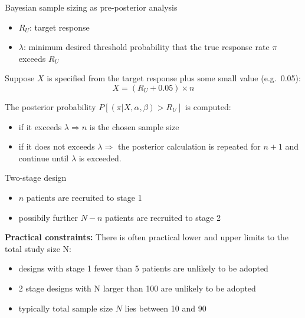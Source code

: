 \documentclass{beamer}
\begin{document}
\begin{frame}{Bayesian sample sizing as pre-posterior analysis}

\begin{itemize}
\itemsep1pt\parskip0pt
\item
  \(R_U\): target response
\item
  \(\lambda\): minimum desired threshold probability that the true
  response rate \(\pi\) exceeds \(R_U\)
\end{itemize}

Suppose \(X\) is specified from the target response plus some small
value (e.g.~0.05): \[X=(R_U+0.05)\times n\]

The posterior probability \(P[(\pi\vert X,\alpha, \beta)>R_U]\) is computed:

\begin{itemize}
\itemsep1pt\parskip0pt
\item
  if it exceeds \(\lambda \Longrightarrow n\) is the chosen sample size
\item
  if it does not exceeds \(\lambda \Longrightarrow\) the posterior
  calculation is repeated for \(n+1\) and continue until \(\lambda\) is
  exceeded.
\end{itemize}

\end{frame}

\begin{frame}{Two-stage design}

\begin{itemize}
\itemsep1pt\parskip0pt
\item
  \(n\) patients are recruited to stage 1
\item
  possibily further \(N-n\) patients are recruited to stage 2
\end{itemize}

\textbf{Practical constraints:} There is often practical lower and upper
limits to the total study size N:

\begin{itemize}
\itemsep1pt\parskip0pt
\item
  designs with stage 1 fewer than 5 patients are unlikely to be adopted
\item
  2 stage designs with N larger than 100 are unlikely to be adopted
\item
  typically total sample size \(N\) lies between 10 and 90
\end{itemize}

\end{frame}
\end{document}
